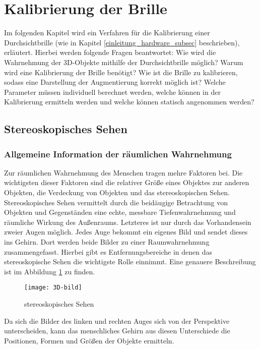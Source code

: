 \section{Kalibrierung der Brille}
Im folgenden Kapitel wird ein Verfahren für die Kalibrierung einer Durchsichtbrille (wie in Kapitel \ref{einleitung_hardware_subsec}  beschrieben), erläutert.
Hierbei werden folgende Fragen beantwortet: 
Wie wird die Wahrnehmung der 3D-Objekte mithilfe der Durchsichtbrille möglich?
Warum wird eine Kalibrierung der Brille benötigt? 
Wie ist die Brille zu kalibrieren, sodass eine Darstellung der Augmentierung korrekt möglich ist? 
Welche Parameter müssen individuell berechnet werden, welche können in der Kalibrierung ermitteln werden und welche können statisch angenommen werden?

\subsection{Stereoskopisches Sehen}
\label{sec:Stereoskopisches 3D}
\subsubsection{Allgemeine Information der räumlichen Wahrnehmung}
Zur räumlichen Wahrnehmung des Menschen tragen mehre Faktoren bei.
Die wichtigsten dieser Faktoren sind die relativer Größe eines Objektes zur anderen Objekten, die Verdeckung von Objekten und das stereoskopischen Sehen. 
Stereoskopisches Sehen vermittelt durch die beidäugige Betrachtung von Objekten und Gegenständen eine echte, messbare Tiefenwahrnehmung und räumliche Wirkung des Außenraums. 
Letzteres ist nur durch das Vorhandensein zweier Augen möglich.
Jedes Auge bekommt ein eigenes Bild und sendet dieses ins Gehirn.
Dort werden beide Bilder zu einer Raumwahrnehmung zusammengefasst.
Hierbei gibt es Entfernungsbereiche in denen das stereoskopische Sehen die wichtigste Rolle einnimmt.
Eine genauere Beschreibung ist im Abbildung \ref{fig:3D} zu finden.

\begin{figure}[h]
   \centering
   \texttt{[image: 3D-bild]}
   \caption{stereoskopisches Sehen}
   \label{fig:3D}
\end{figure}

Da sich die Bilder des linken und rechten Auges sich von der Perspektive unterscheiden, kann das menschliches Gehirn aus diesen Unterschiede die Positionen, Formen und Größen der Objekte ermitteln.


